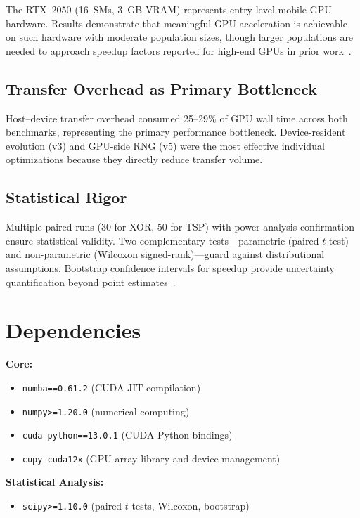 \documentclass[a4paper,14pt]{extarticle}
\begin{document}
The RTX~2050 (16~SMs, 3~GB VRAM) represents entry-level mobile GPU hardware. Results
demonstrate that meaningful GPU acceleration is achievable on such hardware with moderate
population sizes, though larger populations are needed to approach speedup factors reported
for high-end GPUs in prior work~\cite{plichta2014implementation}.

\subsection{Transfer Overhead as Primary Bottleneck}

Host--device transfer overhead consumed 25--29\% of GPU wall time across both benchmarks,
representing the primary performance bottleneck. Device-resident evolution (v3) and GPU-side
RNG (v5) were the most effective individual optimizations because they directly reduce transfer
volume.

\subsection{Statistical Rigor}

Multiple paired runs (30 for XOR, 50 for TSP) with power analysis confirmation ensure
statistical validity. Two complementary tests---parametric (paired $t$-test) and
non-parametric (Wilcoxon signed-rank)---guard against distributional assumptions.
Bootstrap confidence intervals for speedup provide uncertainty quantification beyond
point estimates~\cite{cohen1988power}.


\section{Dependencies}

\textbf{Core:}
\begin{itemize}
  \item \texttt{numba==0.61.2} (CUDA JIT compilation)
  \item \texttt{numpy>=1.20.0} (numerical computing)
  \item \texttt{cuda-python==13.0.1} (CUDA Python bindings)
  \item \texttt{cupy-cuda12x} (GPU array library and device management)
\end{itemize}

\textbf{Statistical Analysis:}
\begin{itemize}
  \item \texttt{scipy>=1.10.0} (paired $t$-tests, Wilcoxon, bootstrap)
\end{itemize}
\end{document}
